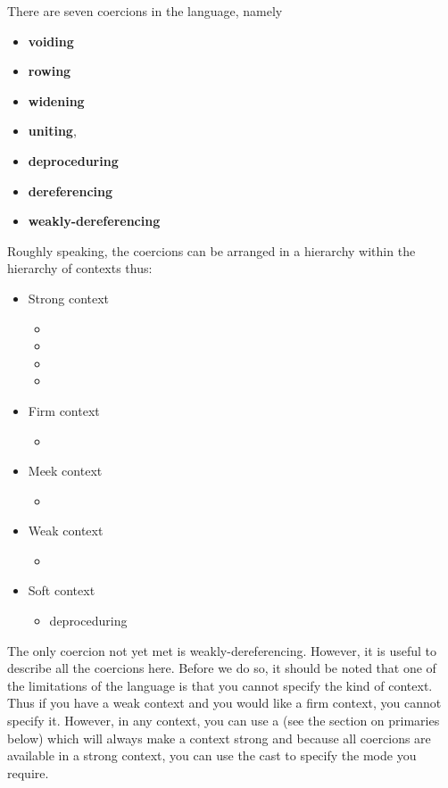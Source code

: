 There are seven coercions in the language, namely
\begin{itemize}
\item \textbf{voiding}
\item \textbf{rowing}
\item \textbf{widening}
\item \textbf{uniting},
\item \textbf{deproceduring}
\item \textbf{dereferencing}
\item \textbf{weakly-dereferencing}
\end{itemize}
Roughly speaking, the coercions can be
arranged in a hierarchy within the hierarchy of contexts thus:
\begin{itemize}
\item Strong context
\begin{itemize}
\item {}
\item {}
\item {}
\item {}
\end{itemize}
\item Firm context
\begin{itemize}
\item {}
\end{itemize}
\item Meek context
\begin{itemize}
\item {}
\end{itemize}
\item Weak context
\begin{itemize}
\item {}
\end{itemize}
\item Soft context
\begin{itemize}
\item deproceduring
\end{itemize}
\end{itemize}

The only coercion not yet met is weakly-dereferencing. However, it is
useful to describe all the coercions here. Before we do so, it should
be noted that one of the limitations of the language is that you
cannot specify the kind of context. Thus if you have a weak context
and you would like a firm context, you cannot specify it. However, in
any context, you can use a  (see the section on primaries
below) which will always make a context strong and because all
coercions are available in a strong context, you can use the cast to
specify the mode you require.


